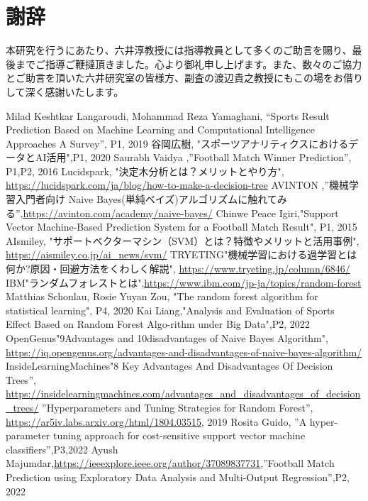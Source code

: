 \documentclass[platex]{suribt}
\begin{document}
\backmatter%
\chapter{謝辞}%

本研究を行うにあたり、六井淳教授には指導教員として多くのご助言を賜り、最後までご指導ご鞭撻頂きました。心より御礼申し上げます。また、数々のご協力とご助言を頂いた六井研究室の皆様方、副査の渡辺貴之教授にもこの場をお借りして深く感謝いたします。

\begin{thebibliography}{2}%
\bibitem{}
Milad Keshtkar Langaroudi, Mohammad Reza Yamaghani, “Sports Result Prediction Based on Machine Learning and Computational Intelligence Approaches A Survey”, P1, 2019
\bibitem{}
谷岡広樹, "スポーツアナリティクスにおけるデータとAI活用",P1, 2020
\bibitem{}
Saurabh Vaidya ,”Football Match Winner Prediction”, P1,P2, 2016
\bibitem{}
Lucidspark, "決定木分析とは？メリットとやり方", \url{https://lucidspark.com/ja/blog/how-to-make-a-decision-tree}
\bibitem{}
AVINTON ,”機械学習入門者向け Naive Bayes(単純ベイズ)アルゴリズムに触れてみる”,\url{https://avinton.com/academy/naive-bayes/}
\bibitem{}
Chinwe Peace Igiri,"Support Vector Machine-Based Prediction System for a Football Match Result", P1, 2015
\bibitem{}
AIsmiley, "サポートベクターマシン（SVM）とは？特徴やメリットと活用事例", \url{https://aismiley.co.jp/ai_news/svm/}
\bibitem{}
TRYETING"機械学習における過学習とは何か?原因・回避方法をくわしく解説", \url{https://www.tryeting.jp/column/6846/}
\bibitem{}
IBM"ランダムフォレストとは",\url{https://www.ibm.com/jp-ja/topics/random-forest}
\bibitem{}
Matthias Schonlau, Rosie Yuyan Zou, "The random forest algorithm for statistical learning", P4, 2020
\bibitem{}
Kai Liang,"Analysis and Evaluation of Sports Effect Based on Random Forest Algo-rithm under Big Data",P2, 2022
\bibitem{}
OpenGenus"9Advantages and 10disadvantages of Naive Bayes Algorithm", \url{https://iq.opengenus.org/advantages-and-disadvantages-of-naive-bayes-algorithm/}
\bibitem{}
InsideLearningMachines"8 Key Advantages And Disadvantages Of Decision Trees”, \url{https://insidelearningmachines.com/advantages_and_disadvantages_of_decision_trees/}
\bibitem{}
”Hyperparameters and Tuning Strategies for Random Forest”, \url{https://ar5iv.labs.arxiv.org/html/1804.03515}, 2019
\bibitem{}
Rosita Guido, ”A hyper-parameter tuning approach for cost-sensitive support vector machine classifiers”,P3,2022
\bibitem{}
Ayush Majumdar,\url{https://ieeexplore.ieee.org/author/37089837731},”Football Match Prediction using Exploratory Data Analysis and Multi-Output Regression”,P2, 2022

\end{thebibliography}
\end{document}
